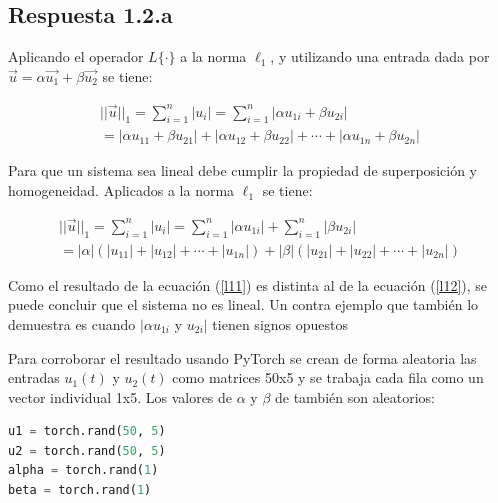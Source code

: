\documentclass[12 pt]{article}
\begin{document}
\begin{enumerate}
\subsection{Respuesta 1.2.a}

Aplicando el operador ${L\{ \cdot \}}$ a la norma ${\ell_{1}}$, y utilizando una entrada dada por ${\vec{u}=\alpha \vec{u_{1}} + \beta \vec{u_{2}}}$ se tiene:

\begin{center}
\begin{equation} \label{l11}
\begin{split}
 ||\vec{u}||_{1} = \sum_{i=1}^{n} |u_{i}| = \sum_{i=1}^{n} |\alpha u_{1i} + \beta u_{2i}| \\
 = |\alpha u_{11} + \beta u_{21}| + |\alpha u_{12} + \beta u_{22}| + \cdots + |\alpha u_{1n} + \beta u_{2n}|
\end{split}
\end{equation}
\end{center}

Para que un sistema sea lineal debe cumplir la propiedad de superposición y homogeneidad. Aplicados a la norma ${\ell_{1}}$ se tiene:

\begin{center}
\begin{equation} \label{l12}
\begin{split}
 ||\vec{u}||_{1} = \sum_{i=1}^{n} |u_{i}| = \sum_{i=1}^{n} |\alpha u_{1i}| + \sum_{i=1}^{n} |\beta u_{2i}| \\
 = |\alpha| (|u_{11}| + |u_{12}| + \cdots + |u_{1n}|) + |\beta| (|u_{21}| + |u_{22}| + \cdots + |u_{2n}|)
\end{split}
\end{equation}
\end{center}

Como el resultado de la ecuación (\ref{l11}) es distinta al de la ecuación (\ref{l12}), se puede concluir que el sistema no es lineal. Un contra ejemplo que también lo demuestra es cuando ${|\alpha u_{1i}}$ y ${u_{2i}|}$ tienen signos opuestos

Para corroborar el resultado usando PyTorch se crean de forma aleatoria las entradas ${u_{1}(t)}$ y ${u_{2}(t)}$ como matrices 50x5 y se trabaja cada fila como un vector individual 1x5. Los valores de ${\alpha}$ y ${\beta}$ de también son aleatorios:

\begin{lstlisting}[language=Python]
u1 = torch.rand(50, 5)
u2 = torch.rand(50, 5)
alpha = torch.rand(1)
beta = torch.rand(1)


\end{lstlisting}
\end{enumerate}
\end{document}
